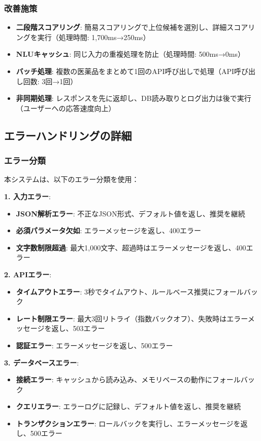 \documentclass[a4paper,11pt,ja=standard,xelatex]{bxjsarticle}
\theoremstyle{definition}
\begin{document}
\subsubsection{改善施策}

\begin{itemize}
\item \textbf{二段階スコアリング}: 簡易スコアリングで上位候補を選別し、詳細スコアリングを実行（処理時間: 1,700ms→250ms）
\item \textbf{NLUキャッシュ}: 同じ入力の重複処理を防止（処理時間: 500ms→0ms）
\item \textbf{バッチ処理}: 複数の医薬品をまとめて1回のAPI呼び出しで処理（API呼び出し回数: 3回→1回）
\item \textbf{非同期処理}: レスポンスを先に返却し、DB読み取りとログ出力は後で実行（ユーザーへの応答速度向上）
\end{itemize}

\subsection{エラーハンドリングの詳細}

\subsubsection{エラー分類}

本システムは、以下のエラー分類を使用：

\textbf{1. 入力エラー}:
\begin{itemize}
\item \textbf{JSON解析エラー}: 不正なJSON形式、デフォルト値を返し、推奨を継続
\item \textbf{必須パラメータ欠如}: エラーメッセージを返し、400エラー
\item \textbf{文字数制限超過}: 最大1,000文字、超過時はエラーメッセージを返し、400エラー
\end{itemize}

\textbf{2. APIエラー}:
\begin{itemize}
\item \textbf{タイムアウトエラー}: 3秒でタイムアウト、ルールベース推奨にフォールバック
\item \textbf{レート制限エラー}: 最大3回リトライ（指数バックオフ）、失敗時はエラーメッセージを返し、503エラー
\item \textbf{認証エラー}: エラーメッセージを返し、500エラー
\end{itemize}

\textbf{3. データベースエラー}:
\begin{itemize}
\item \textbf{接続エラー}: キャッシュから読み込み、メモリベースの動作にフォールバック
\item \textbf{クエリエラー}: エラーログに記録し、デフォルト値を返し、推奨を継続
\item \textbf{トランザクションエラー}: ロールバックを実行し、エラーメッセージを返し、500エラー
\end{itemize}
\end{document}
